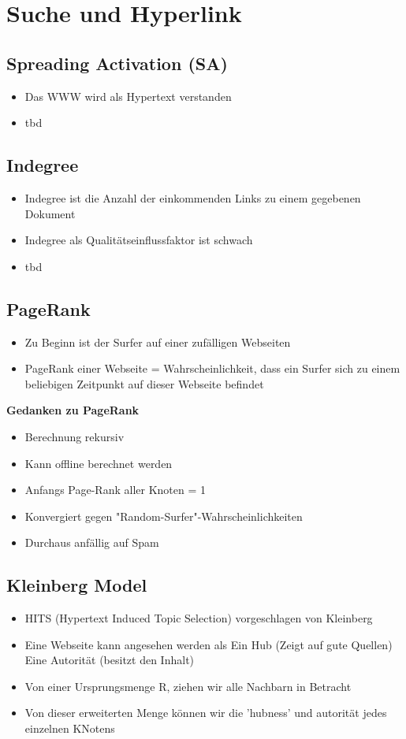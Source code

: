 \documentclass{report}
\theoremstyle{definition}
\theoremstyle{example}
\begin{document}
\section{Suche und Hyperlink}

\subsection{Spreading Activation (SA)}
\begin{itemize}
   \item Das WWW wird als Hypertext verstanden
   \item tbd
\end{itemize}

\subsection{Indegree}
\begin{itemize}
   \item Indegree ist die Anzahl der einkommenden Links zu einem gegebenen Dokument
   \item Indegree als Qualitätseinflussfaktor ist schwach
   \item tbd
\end{itemize}

\subsection{PageRank}
\begin{itemize}
   \item Zu Beginn ist der Surfer auf einer zufälligen Webseiten
   \item PageRank einer Webseite = Wahrscheinlichkeit, dass ein Surfer sich zu einem beliebigen Zeitpunkt auf dieser Webseite befindet
\end{itemize}

\textbf{Gedanken zu PageRank}
\begin{itemize}
   \item Berechnung rekursiv
   \item Kann offline berechnet werden
   \item Anfangs Page-Rank aller Knoten = 1
   \item Konvergiert gegen "Random-Surfer"-Wahrscheinlichkeiten
   \item Durchaus anfällig auf Spam
\end{itemize}

\subsection{Kleinberg Model}
\begin{itemize}
   \item HITS (Hypertext Induced Topic Selection) vorgeschlagen von Kleinberg
   \item Eine Webseite kann angesehen werden als
   \subitem Ein Hub (Zeigt auf gute Quellen)
   \subitem Eine Autorität (besitzt den Inhalt)
   \item Von einer Ursprungsmenge R, ziehen wir alle Nachbarn in Betracht
   \item Von dieser erweiterten Menge können wir die 'hubness' und autorität jedes einzelnen KNotens 
\end{itemize}
\end{document}
